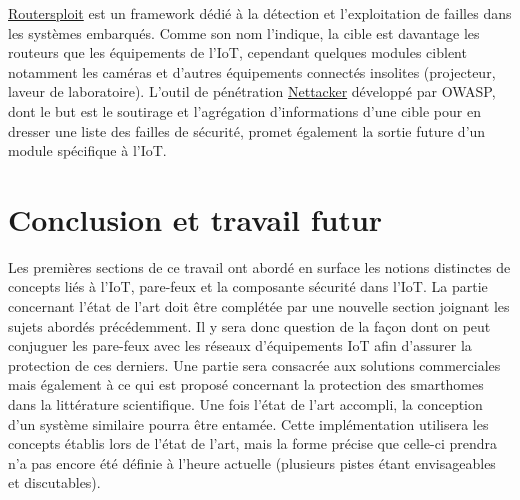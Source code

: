 \documentclass[]{article}
\begin{document}
\par \href{https://github.com/threat9/routersploit}{Routersploit} est un framework dédié à la détection et l'exploitation de failles dans les systèmes embarqués. Comme son nom l'indique, la cible est davantage les routeurs que les équipements de l'IoT, cependant quelques modules ciblent notamment les caméras et d'autres équipements connectés insolites (projecteur, laveur de laboratoire). L'outil de pénétration \href{https://github.com/zdresearch/OWASP-Nettacker}{Nettacker} développé par OWASP, dont le but est le soutirage et l'agrégation d'informations d'une cible pour en dresser une liste des failles de sécurité, promet également la sortie future d'un module spécifique à l'IoT.





\newpage

\section{Conclusion et travail futur}

\par Les premières sections de ce travail ont abordé en surface les notions distinctes de concepts liés à l'IoT, pare-feux et la composante sécurité dans l'IoT. La partie concernant l'état de l'art doit être complétée par une nouvelle section joignant les sujets abordés précédemment. Il y sera donc question de la façon dont on peut conjuguer les pare-feux avec les réseaux d'équipements IoT afin d'assurer la protection de ces derniers. Une partie sera consacrée aux solutions commerciales mais également à ce qui est proposé concernant la protection des smarthomes dans la littérature scientifique. Une fois l'état de l'art accompli, la conception d'un système similaire pourra être entamée. Cette implémentation utilisera les concepts établis lors de l'état de l'art, mais la forme précise que celle-ci prendra n'a pas encore été définie à l'heure actuelle (plusieurs pistes étant envisageables et discutables).

\newpage



\end{document}
